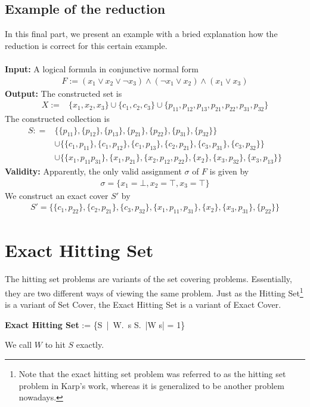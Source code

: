 \subsection{Example of the reduction}
In this final part, we present an example with a bried explanation how the reduction is correct for 
this certain example.\\\\
\textbf{Input:} A logical formula in conjunctive normal form 
\begin{align*}
    F := (x_1 \lor x_2 \lor \neg x_3) \land (\neg x_1 \lor x_2) \land (x_1 \lor x_3)
\end{align*}
\textbf{Output:}
The constructed set is
\begin{align*}
    X := & \{ x_1 ,x_2, x_3\} \cup \{c_1, c_2, c_3\} \cup 
    \{p_{11}, p_{12}, p_{13}, p_{21}, p_{22}, p_{31}, p_{32}\}
\end{align*}
The constructed collection is 
\begin{align*}
    S : = & \{\{p_{11}\}, \{p_{12}\}, \{p_{13}\}, \{p_{21}\}, \{p_{22}\}, \{p_{31}\}, \{p_{32}\}\} \\
      & \cup  \{\{c_1, p_{11}\}, \{c_1, p_{12}\}, \{c_1, p_{13}\}, \{c_2, p_{21}\}, 
      \{c_3, p_{31}\}, \{c_3, p_{32}\}\} \\ 
      & \cup \{\{x_1, p_{11} p_{31}\}, \{x_1, p_{21}\}, \{x_2, p_{12}, p_{22}\}, \{x_2\},
      \{x_3, p_{32}\}, \{x_3, p_{13}\}\}
\end{align*}
\textbf{Validity:} Apparently, the only valid assignment $\sigma$ of $F$ is given by 
\begin{align*}
    \sigma = \{x_1 = \bot, x_2 = \top, x_3 = \top \}
\end{align*}
We construct an exact cover $S'$ by 
\begin{align*}
    S' = \{\{c_1, p_{22}\}, \{c_2, p_{21}\}, \{c_3, p_{32}\},
    \{x_1, p_{11}, p_{31}\}, \{x_2\}, \{x_3, p_{31}\},
    \{p_{22}\}\}
\end{align*}

\section{Exact Hitting Set}
The hitting set problems are variants of the set covering problems. Essentially, they are two different ways 
of viewing the same problem. Just as the Hitting Set\footnote{Note that the exact hitting set problem was referred to as the hitting set problem in Karp's work, whereas 
it is generalized to be another problem nowadays.} is a variant of Set Cover, the Exact Hitting Set is 
a variant of Exact Cover. 
\begin{myalign}
   \textbf{Exact Hitting Set} := \{S\ |\ \exists W.\ \forall s \in S.\ |W \cap s| = 1\}
\end{myalign}
We call $W$ to hit $S$ exactly.
 

